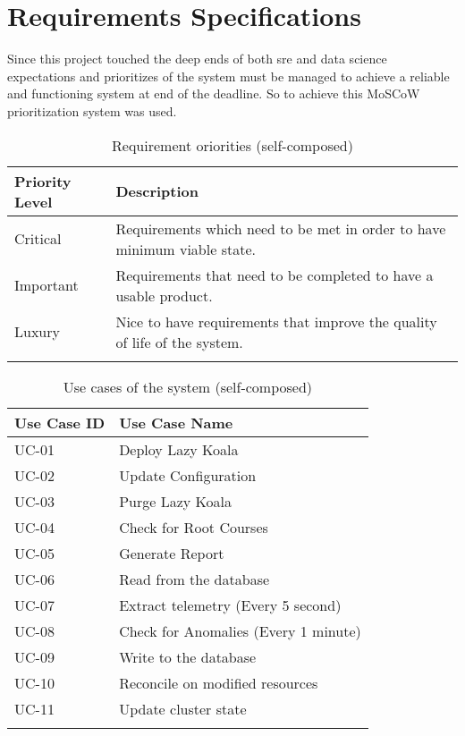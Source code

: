 \section{Requirements Specifications}

Since this project touched the deep ends of both \ac{sre} and data science expectations and prioritizes of the system must be managed to achieve a reliable and functioning system at end of the deadline. So to achieve this MoSCoW prioritization system was used.

\begin{longtable}{|p{25mm}|p{128mm}|}
\hline
    \textbf{Priority Level} &
    \textbf{Description} \\ \hline
    
    Critical  &
    Requirements which need to be met in order to have minimum viable state. \\ \hline

    Important &
    Requirements that need to be completed to have a usable product. \\ \hline

    Luxury &
    Nice to have requirements that improve the quality of life of the system. \\ \hline
\caption{Requirement oriorities (self-composed)}
\end{longtable}

\begin{longtable}{|p{35mm}|p{118mm}|}
\hline
    \textbf{Use Case ID} & \textbf{Use Case Name }              \\ \hline
    UC-01                & Deploy Lazy Koala                    \\ \hline
    UC-02                & Update Configuration                 \\ \hline
    UC-03                & Purge Lazy Koala                     \\ \hline
    UC-04                & Check for Root Courses               \\ \hline
    UC-05                & Generate Report                      \\ \hline
    UC-06                & Read from the database               \\ \hline
    UC-07                & Extract telemetry (Every 5 second)   \\ \hline
    UC-08                & Check for Anomalies (Every 1 minute) \\ \hline
    UC-09                & Write to the database                \\ \hline
    UC-10                & Reconcile on modified resources      \\ \hline
    UC-11                & Update cluster state                 \\ \hline
\caption{Use cases of the system (self-composed)}
\end{longtable}

